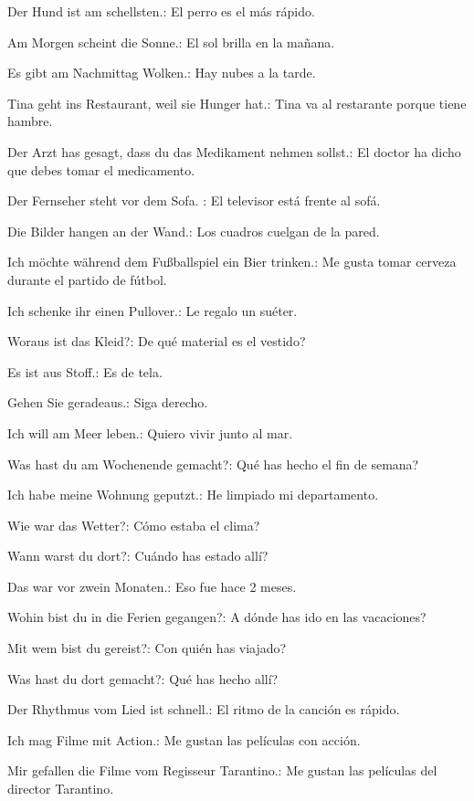 \begin{myitemize}
\item Der Hund ist am schellsten.: El perro es el más rápido.
\item Am Morgen scheint die Sonne.: El sol brilla en la mañana.
\item Es gibt am Nachmittag Wolken.: Hay nubes a la tarde.
\item Tina geht ins Restaurant, weil sie Hunger hat.: Tina va al restarante porque tiene hambre.
\item Der Arzt has gesagt, dass du das Medikament nehmen sollst.: El doctor ha dicho que debes tomar el medicamento.
\item Der Fernseher steht vor dem Sofa. : El televisor está frente al sofá.
\item Die Bilder hangen an der Wand.: Los cuadros cuelgan de la pared.
\item Ich möchte während dem Fußballspiel ein Bier trinken.: Me gusta tomar cerveza durante el partido de fútbol.
\item Ich schenke ihr einen Pullover.: Le regalo un suéter.
\item Woraus ist das Kleid?: De qué material es el vestido?
\item Es ist aus Stoff.: Es de tela.
\item Gehen Sie geradeaus.: Siga derecho.
\item Ich will am Meer leben.: Quiero vivir junto al mar.
\item Was hast du am Wochenende gemacht?: Qué has hecho el fin de semana?
\item Ich habe meine Wohnung geputzt.: He limpiado mi departamento.
\item Wie war das Wetter?: Cómo estaba el clima?
\item Wann warst du dort?: Cuándo has estado allí?
\item Das war vor zwein Monaten.: Eso fue hace 2 meses.
\item Wohin bist du in die Ferien gegangen?: A dónde has ido en las vacaciones?
\item Mit wem bist du gereist?: Con quién has viajado?
\item Was hast du dort gemacht?: Qué has hecho allí? 
\item Der Rhythmus vom Lied ist schnell.: El ritmo de la canción es rápido.
\item Ich mag Filme mit Action.: Me gustan las películas con acción.
\item Mir gefallen die Filme vom Regisseur Tarantino.: Me gustan las películas del director Tarantino.

\end{myitemize}
